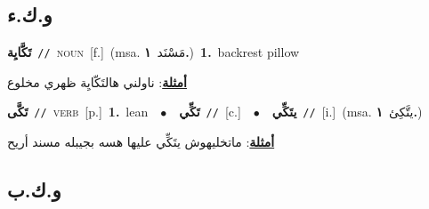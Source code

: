 \documentclass[10pt,a4paper,twoside]{article} %
\begin{document}
\begin{multicols}{2}
\vspace{-3mm}
\subsection*{\color{blue}\foreignlanguage{arabic}{و.ك.ء}\color{blue}{}} 

{\setlength\topsep{0pt}\textbf{\foreignlanguage{arabic}{تَكَّايِة}}\ {\color{gray}\texttt{//}\color{black}}\ \textsc{noun}\ [f.]\ \color{gray}(msa. \foreignlanguage{arabic}{مَسْنَد}~\foreignlanguage{arabic}{\textbf{١.}})\color{black}\ \textbf{1.}~backrest pillow\  \begin{flushright}\color{gray}\foreignlanguage{arabic}{\textbf{\underline{\foreignlanguage{arabic}{أمثلة}}}: ناولني هالتَكّايِة ظهري مخلوع}\end{flushright}\color{black}} \vspace{2mm}

{\setlength\topsep{0pt}\textbf{\foreignlanguage{arabic}{تَكَّى}}\ {\color{gray}\texttt{//}\color{black}}\ \textsc{verb}\ [p.]\ \textbf{1.}~lean\ \ $\bullet$\ \ \setlength\topsep{0pt}\textbf{\foreignlanguage{arabic}{تَكِّي}}\ {\color{gray}\texttt{//}\color{black}}\ [c.]\ \ $\bullet$\ \ \setlength\topsep{0pt}\textbf{\foreignlanguage{arabic}{يتَكِّي}}\ {\color{gray}\texttt{//}\color{black}}\ [i.]\ \color{gray}(msa. \foreignlanguage{arabic}{يتَّكِئ}~\foreignlanguage{arabic}{\textbf{١.}})\color{black}\  \begin{flushright}\color{gray}\foreignlanguage{arabic}{\textbf{\underline{\foreignlanguage{arabic}{أمثلة}}}: ماتخليهوش يتَكِّي عليها هسه بجيبله مسند أريح}\end{flushright}\color{black}} \vspace{2mm}

\vspace{-3mm}
\subsection*{\color{blue}\foreignlanguage{arabic}{و.ك.ب}\color{blue}{}} 


\end{multicols}
\end{document}
